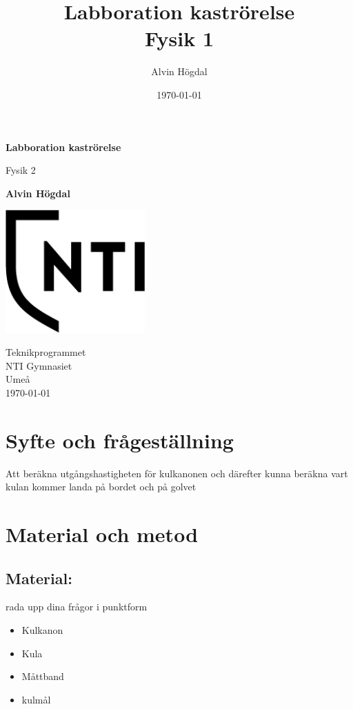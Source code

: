 \documentclass[11p]{article}
\title{Labboration kaströrelse \\ \small Fysik 1}
\author{Alvin Högdal}
\date{\today}
\begin{document}
    \begin{titlepage}
        \begin{center}
            \vspace*{1cm}

            \Huge
            \textbf{Labboration kaströrelse}

            \vspace{0.5cm}
            \LARGE
            Fysik 2

            \vspace{1.5cm}

            \textbf{Alvin Högdal}

            \vfill


            \vspace{0.8cm}

            \includegraphics[width=0.4\textwidth]{../images/NTI Gymnasiet_Symbol_print_svart.png}

            \Large
            Teknikprogrammet\\
            NTI Gymnasiet\\
            Umeå\\
            \today

        \end{center}
    \end{titlepage}
    \tableofcontents
    \newpage
    \section{Syfte och frågeställning}
    Att beräkna utgångshastigheten för kulkanonen och därefter kunna beräkna vart kulan kommer landa på bordet och på golvet
    \section{Material och metod}

    \subsection{Material:}
    rada upp dina frågor i punktform
    \begin{itemize}
        \item Kulkanon
        \item Kula
        \item Måttband
        \item kulmål
    \end{itemize}
\end{document}
